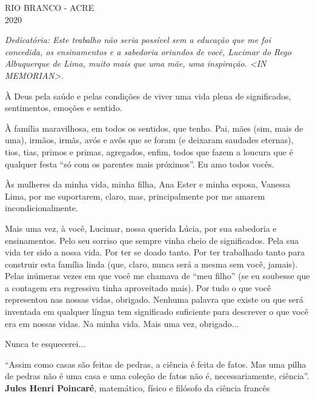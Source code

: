 \documentclass[
	12pt,				%
	openright,			%
	oneside,			%
	a4paper,			%
	english,			%
	french,				%
	spanish,			%
	brazil				%
	]{abntex2}
\begin{document}
\begin{center}
	\vspace{4mm}
	RIO BRANCO - ACRE \\
	2020
	
\end{center}
\clearpage
\begin{dedicatoria}
   \vspace*{\fill}
   \centering
   \noindent
   \textit{ Dedicat\'oria: Este trabalho não seria possível sem a educação que me foi concedida, os ensinamentos e a sabedoria oriundos de você, Lucimar do Rego Albuquerque de Lima, muito mais que uma mãe, uma inspiração. <IN MEMORIAN>.} \vspace*{\fill}
\end{dedicatoria}

\begin{agradecimentos}
À Deus pela saúde e pelas condições de viver uma vida plena de significados, sentimentos, emoções e sentido.

À família maravilhosa, em todos os sentidos, que tenho. Pai, mães (sim, mais de uma), irmãos, irmãs, avós e avôs que se foram (e deixaram saudades eternas), tios, tias, primos e primas, agregados, enfim, todos que fazem a loucura que é qualquer festa ``só com os parentes mais próximos''. Eu amo todos vocês. 

Às mulheres da minha vida, minha filha, Ana Ester e minha esposa, Vanessa Lima, por me suportarem, claro, mas, principalmente por me amarem incondicionalmente.

Mais uma vez, à você, Lucimar, nossa querida Lúcia, por sua sabedoria e ensinamentos. Pelo seu sorriso que sempre vinha cheio de significados. Pela sua vida ter sido a nossa vida. Por ter se doado tanto. Por ter trabalhado tanto para construir esta família linda (que, claro, nunca será a mesma sem você, jamais). Pelas inúmeras vezes em que você me chamava de ``meu filho'' (se eu soubesse que a contagem era regressiva tinha aproveitado mais). Por tudo o que você representou nas nossas vidas, obrigado. Nenhuma palavra que existe ou que será inventada em qualquer língua tem significado suficiente para descrever o que você era em nossas vidas. Na minha vida. Mais uma vez, obrigado... 

Nunca te esquecerei...
\end{agradecimentos}
\clearpage
\begin{epigrafe}
    \vspace*{\fill}
	\begin{flushright}
		``Assim como casas são feitas de pedras, a ciência é feita de fatos. Mas uma pilha de pedras não é uma casa e uma coleção de fatos não é, necessariamente, ciência''.  \\ \textbf{Jules Henri Poincaré}, matemático, físico e filósofo da ciência francês
	\end{flushright}
\end{epigrafe}
\end{document}

